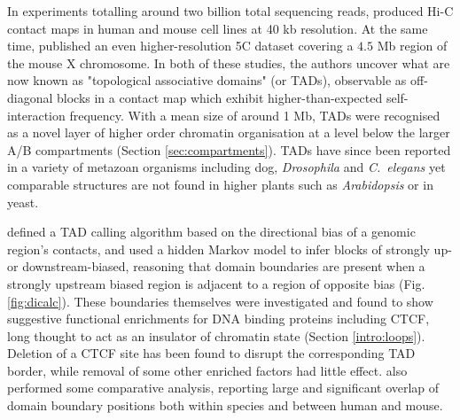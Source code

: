 \documentclass[a4paper,11pt,oneside]{book}
\begin{document}
In experiments totalling around two billion total sequencing reads, \citet{Dixon2012} produced Hi-C contact maps in human and mouse cell lines at 40 kb resolution. At the same time, \citet{Nora2012} published an even higher-resolution 5C dataset covering a $4.5$ Mb region of the mouse X chromosome. In both of these studies, the authors uncover what are now known as "topological associative domains" (or TADs), observable as off-diagonal blocks in a contact map which exhibit higher-than-expected self-interaction frequency. With a mean size of around 1 Mb, TADs were recognised as a novel layer of higher order chromatin organisation at a level below the larger A/B compartments (Section \ref{sec:compartments}). TADs have since been reported in a variety of metazoan organisms including dog,\cite{VietriRudan2015} \emph{Drosophila}\cite{Sexton2012, Hou2012} and \emph{C.~elegans}\cite{Crane2015} yet comparable structures are not found in higher plants such as \emph{Arabidopsis}\cite{Feng2014, Wang2015} or in yeast.\cite{Duan2010, Gong2015}

\citet{Dixon2012} defined a TAD calling algorithm based on the directional bias of a genomic region's contacts, and used a hidden Markov model to infer blocks of strongly up- or downstream-biased, reasoning that domain boundaries are present when a strongly upstream biased region is adjacent to a region of opposite bias (Fig. \ref{fig:dicalc}). These boundaries themselves were investigated and found to show suggestive functional enrichments for DNA binding proteins including CTCF, long thought to act as an insulator of chromatin state (Section \ref{intro:loops}). Deletion of a  CTCF site has been found to disrupt the corresponding TAD border, while removal of some other enriched factors had little effect.\cite{Nora2012, Zuin2013, Narendra2015}
\citet{Dixon2012} also performed some comparative analysis, reporting large and significant overlap of domain boundary positions both within species and between human and mouse.
\end{document}
